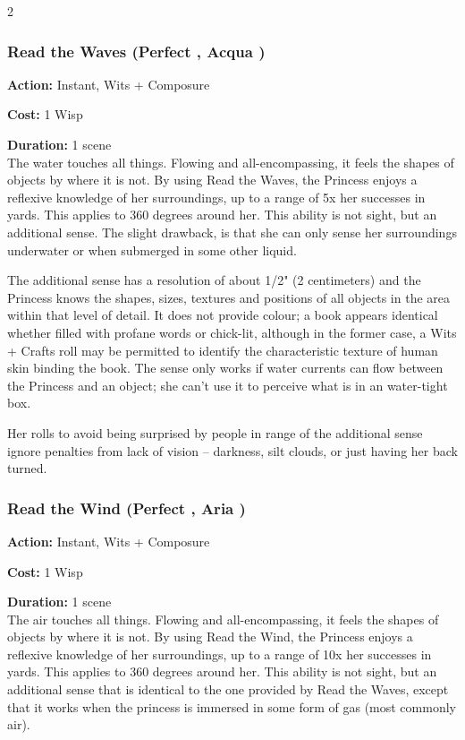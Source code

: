 \begin{multicols}{2}
\subsubsection*{Read the Waves (Perfect \textbullet, Acqua \textbullet)}

\noindent \textbf{Action:} Instant, Wits + Composure

\noindent \textbf{Cost:} 1 Wisp

\noindent \textbf{Duration:} 1 scene \\

\noindent The water touches all things. Flowing and all-encompassing, it feels the shapes of objects by where it is not. By using Read the Waves, the Princess enjoys a reflexive knowledge of her surroundings, up to a range of 5x her successes in yards. This applies to 360 degrees around her. This ability is not sight, but an additional sense. The slight drawback, is that she can only sense her surroundings underwater or when submerged in some other liquid. 

The additional sense has a resolution of about 1/2" (2 centimeters) and the Princess knows the shapes, sizes, textures and positions of all objects in the area within that level of detail. It does not provide colour; a book appears identical whether filled with profane words or chick-lit, although in the former case, a Wits + Crafts roll may be permitted to identify the characteristic texture of human skin binding the book. The sense only works if water currents can flow between the Princess and an object; she can't use it to perceive what is in an water-tight box. 

Her rolls to avoid being surprised by people in range of the additional sense ignore penalties from lack of vision -- darkness, silt clouds, or just having her back turned.

\subsubsection*{Read the Wind (Perfect \textbullet, Aria \textbullet)}

\noindent \textbf{Action:} Instant, Wits + Composure

\noindent \textbf{Cost:} 1 Wisp

\noindent \textbf{Duration:} 1 scene \\

\noindent The air touches all things. Flowing and all-encompassing, it feels the shapes of objects by where it is not. By using Read the Wind, the Princess enjoys a reflexive knowledge of her surroundings, up to a range of 10x her successes in yards. This applies to 360 degrees around her. This ability is not sight, but an additional sense that is identical to the one provided by Read the Waves, except that it works when the princess is immersed in some form of gas (most commonly air). 


\end{multicols}
